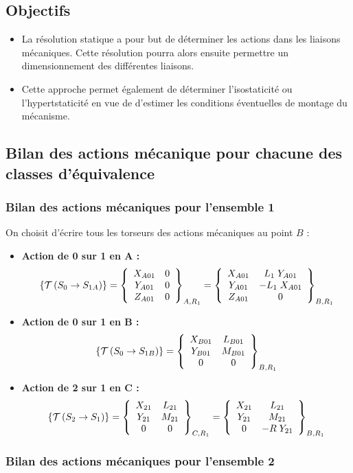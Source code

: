 \documentclass[10pt,fleqn]{article} %
\begin{document}
\fi



\subsection*{Objectifs}
\begin{itemize}
\item La résolution statique a pour but de déterminer les actions dans les liaisons mécaniques. Cette résolution pourra alors ensuite permettre un dimensionnement des différentes liaisons.
\item Cette approche permet également de déterminer l'isostaticité ou l'hypertstaticité en vue de d'estimer les conditions éventuelles de montage du mécanisme.
\end{itemize}

\subsection*{Bilan des actions mécanique pour chacune des classes d'équivalence}
\subsubsection*{Bilan des actions mécaniques pour l'ensemble 1}
On choisit d'écrire tous les torseurs des actions mécaniques au point $B$ :
\begin{itemize}
\item \textbf{Action de 0 sur 1 en A :}
$$
\torseurstat{T}{S_0}{S_{1A}}
=\torseurcol{X_{A01}}{Y_{A01}}{Z_{A01}}{0}{0}{0}{A,R_1}
=\torseurcol{X_{A01}}{Y_{A01}}{Z_{A01}}{L_1\;Y_{A01}}{-L_1\;X_{A01}}{0}{B,R_1}
$$
\item \textbf{Action de 0 sur 1 en B :}
$$
\torseurstat{T}{S_0}{S_{1B}}
=\torseurcol{X_{B01}}{Y_{B01}}{0}{L_{B01}}{M_{B01}}{0}{B,R_1}
$$
\item \textbf{Action de 2 sur 1 en C :}
$$
\torseurstat{T}{S_2}{S_{1}}
=\torseurcol{X_{21}}{Y_{21}}{0}{L_{21}}{M_{21}}{0}{C,R_1}
=\torseurcol{X_{21}}{Y_{21}}{0}{L_{21}}{M_{21}}{-R\;Y_{21}}{B,R_1}
$$

\end{itemize}

\subsubsection{Bilan des actions mécaniques pour l'ensemble 2}
\end{document}

